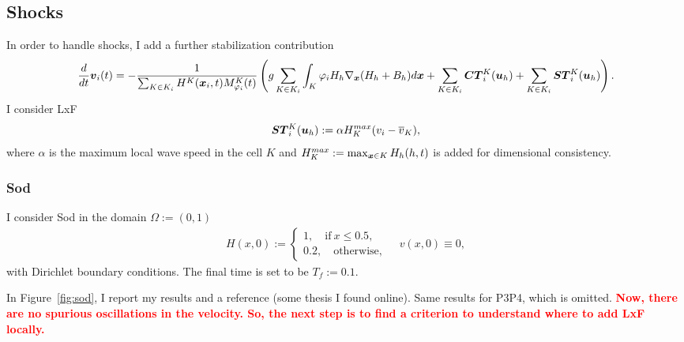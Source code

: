 \documentclass[english]{article}
\theoremstyle{thmstyleone}
\theoremstyle{thmstyletwo}
\theoremstyle{thmstylethree}
\newcommand{\uvec}[2][3]{\boldsymbol{#2\mkern-#1mu}\mkern#1mu}
\begin{document}
\subsection{Shocks}
In order to handle shocks, I add a further stabilization contribution
\begin{equation}
	\frac{d}{dt}\uvec{v}_i(t)=-\frac{1}{\sum_{K \in K_i} H^K(\uvec{x}_i,t) M^K_{\varphi_i}(t)}\left(g \sum_{K \in K_i} \int_K \varphi_i H_h\nabla_{\uvec{x}}(H_h+B_h)  d\uvec{x} + \sum_{K \in K_i}\uvec{CT}^K_i(\uvec{u}_h) + \sum_{K \in K_i}\uvec{ST}^K_i(\uvec{u}_h)\right).
\end{equation}
I consider LxF
\begin{align}
	\uvec{ST}^K_i(\uvec{u}_h):=\alpha H_K^{max}(v_i-\overline{v}_K),
\end{align}
where $\alpha$ is the maximum local wave speed in the cell $K$ and $H_K^{max}:=\max_{\uvec{x}\in K}H_h(h,t)$ is added for dimensional consistency.

\subsubsection{Sod}

I consider Sod in the domain $\Omega:=(0,1)$
\begin{align}
	H(x,0):=\begin{cases}
		1, \quad \text{if}~x\leq 0.5,\\
		0.2, \quad \text{otherwise},		
	\end{cases} \quad v(x,0)\equiv 0,
\end{align}
with Dirichlet boundary conditions. The final time is set to be $T_f:=0.1.$

In Figure~\ref{fig:sod}, I report my results and a reference (some thesis I found online).
Same results for P3P4, which is omitted.
\textcolor{red}{\textbf{Now, there are no spurious oscillations in the velocity. So, the next step is to find a criterion to understand where to add LxF locally.}}
\end{document}
